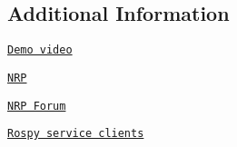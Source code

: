 \subsection*{Additional Information}


\begin{DoxyItemize}
\item \href{https://youtu.be/aice0elP7eI}{\tt Demo video}
\item \href{https://bitbucket.org/hbpneurorobotics/neurorobotics-platform}{\tt N\+RP}
\item \href{https://forum.humanbrainproject.eu/}{\tt N\+RP Forum}
\item \href{http://wiki.ros.org/ROS/Tutorials/WritingServiceClient%28python%29#rospy_tutorials.2BAC8-Tutorials.2BAC8-WritingServiceClient.Writing_the_Client_Node}{\tt Rospy service clients} 
\end{DoxyItemize}